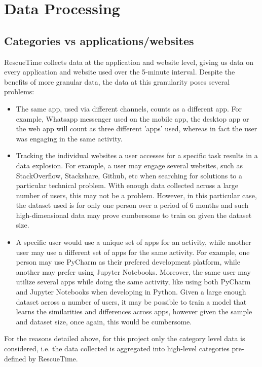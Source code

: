 \section{Data Processing}
\subsection{Categories vs applications/websites}
RescueTime collects data at the application and website level, giving us data on every application and website used over the 5-minute interval. Despite the benefits of more granular data, the data at this granularity poses several problems:
\begin{itemize}
    \item The same app, used via different channels, counts as a different app. For example, Whatsapp messenger used on the mobile app, the desktop app or the web app will count as three different 'apps' used, whereas in fact the user was engaging in the same activity.
    \item Tracking the individual websites a user accesses for a specific task results in a data explosion. For example, a user may engage several websites, such as StackOverflow, Stackshare, Github, etc when searching for solutions to a particular technical problem. With enough data collected across a large number of users, this may not be a problem. However, in this particular case, the dataset used is for only one person over a period of 6 months and such high-dimensional data may prove cumbersome to train on given the dataset size.
    \item A specific user would use a unique set of apps for an activity, while another user may use a different set of apps for the same activity. For example, one person may use PyCharm as their prefered development platform, while another may prefer using Jupyter Notebooks. Moreover, the same user may utilize several apps while doing the same activity, like using both PyCharm and Jupyter Notebooks when developing in Python. Given a large enough dataset across a number of users, it may be possible to train a model that learns the similarities and differences across apps, however given the sample and dataset size, once again, this would be cumbersome.
\end{itemize}

For the reasons detailed above, for this project only the category level data is considered, i.e. the data collected is aggregated into high-level categories pre-defined by RescueTime.

